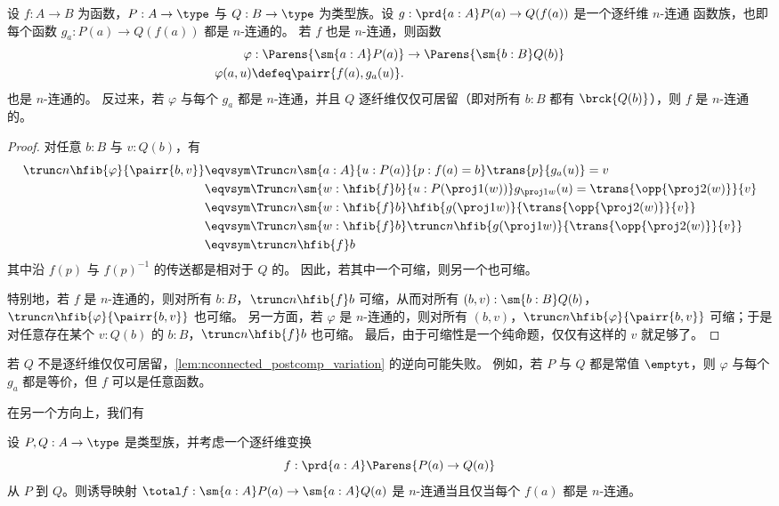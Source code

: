 \begin{lem}\label{lem:nconnected_postcomp_variation}
设 $f:A\to B$ 为函数，$P:A\to\type$ 与 $Q:B\to\type$ 为类型族。设 $g:\prd{a:A} P(a)\to Q(f(a))$
是一个逐纤维 $n$-连通%
函数族，也即每个函数 $g_a : P(a) \to Q(f(a))$ 都是 $n$-连通的。
若 $f$ 也是 $n$-连通，则函数
\begin{align*}
\varphi &:\Parens{\sm{a:A} P(a)}\to\Parens{\sm{b:B} Q(b)}\\
\varphi(a,u) &\defeq \pairr{f(a),g_a(u)}.
\end{align*}
也是 $n$-连通的。
反过来，若 $\varphi$ 与每个 $g_a$ 都是 $n$-连通，并且 $Q$ 逐纤维仅仅可居留（即对所有 $b:B$ 都有 $\brck{Q(b)}$），则 $f$ 是 $n$-连通的。
\end{lem}

\begin{proof}
对任意 $b:B$ 与 $v:Q(b)$，有
{\allowdisplaybreaks
\begin{align*}
\trunc n{\hfib{\varphi}{\pairr{b,v}}} & \eqvsym \Trunc n{\sm{a:A}{u:P(a)}{p:f(a)= b} \trans{p}{g_a(u)}= v}\\
& \eqvsym \Trunc n{\sm{w:\hfib{f}b}{u:P(\proj1(w))} g_{\proj 1 w}(u)= \trans{\opp{\proj2(w)}}{v}}\\
& \eqvsym \Trunc n{\sm{w:\hfib{f}b} \hfib{g(\proj1 w)}{\trans{\opp{\proj 2(w)}}{v}}}\\
& \eqvsym \Trunc n{\sm{w:\hfib{f}b} \trunc n{\hfib{g(\proj1 w)}{\trans{\opp{\proj 2(w)}}{v}}}}\\
& \eqvsym \trunc n{\hfib{f}b}
\end{align*}}%
其中沿 $f(p)$ 与 $f(p)^{-1}$ 的传送都是相对于 $Q$ 的。
因此，若其中一个可缩，则另一个也可缩。

特别地，若 $f$ 是 $n$-连通的，则对所有 $b:B$，$\trunc n{\hfib{f}b}$ 可缩，从而对所有 $(b,v):\sm{b:B} Q(b)$，$\trunc n{\hfib{\varphi}{\pairr{b,v}}}$ 也可缩。
另一方面，若 $\varphi$ 是 $n$-连通的，则对所有 $(b,v)$，$\trunc n{\hfib{\varphi}{\pairr{b,v}}}$ 可缩；于是对任意存在某个 $v:Q(b)$ 的 $b:B$，$\trunc n{\hfib{f}b}$ 也可缩。
最后，由于可缩性是一个纯命题，仅仅有这样的 $v$ 就足够了。
\end{proof}

若 $Q$ 不是逐纤维仅仅可居留，\cref{lem:nconnected_postcomp_variation} 的逆向可能失败。
例如，若 $P$ 与 $Q$ 都是常值 $\emptyt$，则 $\varphi$ 与每个 $g_a$ 都是等价，但 $f$ 可以是任意函数。

在另一个方向上，我们有

\begin{lem}\label{prop:nconn_fiber_to_total}
设 $P,Q:A\to\type$ 是类型族，并考虑一个逐纤维变换
\begin{equation*}
f:\prd{a:A} \Parens{P(a)\to Q(a)}
\end{equation*}
从 $P$ 到 $Q$。则诱导映射 $\total f: \sm{a:A}P(a) \to \sm{a:A} Q(a)$ 是 $n$-连通当且仅当每个 $f(a)$ 都是 $n$-连通。
\end{lem}

